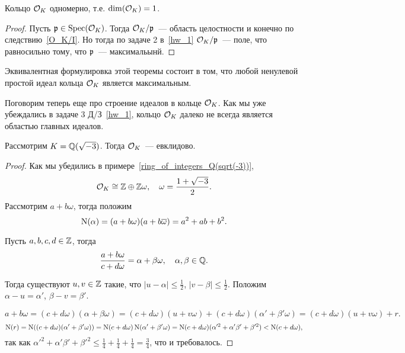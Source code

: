 	\begin{theorem} 
		Кольцо $\mathcal{O}_{K}$ одномерно, т.е. $\dim(\mathcal{O}_{K}) = 1$. 
	\end{theorem}

	\begin{proof}
		Пусть $\mathfrak{p} \in \operatorname{Spec}(\mathcal{O}_{K})$. Тогда $\mathcal{O}_{K}/\mathfrak{p}$~--- область целостности и конечно по  следствию~\ref{O_K/I}. Но тогда по задаче 2 в~\ref{hw_1} $\mathcal{O}_{K}/\mathfrak{p}$~--- поле, что равносильно тому, что $\mathfrak{p}$~--- максимальынй. 
	\end{proof}

	\begin{remark}
		Эквивалентная формулировка этой теоремы состоит в том, что любой ненулевой простой идеал  кольца $\mathcal{O}_{K}$ является максимальным. 
	\end{remark}

	Поговорим теперь еще про строение идеалов в кольце $\mathcal{O}_{K}$. Как мы уже убеждались в задаче 3 Д/З~\ref{hw_1}, кольцо $\mathcal{O}_{K}$ далеко не всегда является областью главных идеалов. 

	\begin{statement} 
		Рассмотрим $K = \mathbb{Q}(\sqrt{-3})$. Тогда $\mathcal{O}_{K}$~--- евклидово. 
	\end{statement}

	\begin{proof}
		Как мы убедились в примере~\ref{ring_of_integers_Q(sqrt(-3))}, 
		\[
			\mathcal{O}_{K} \cong \mathbb{Z} \oplus \mathbb{Z} \omega, \quad \omega = \frac{1 + \sqrt{-3}}{2}. 
		\]
		Рассмотрим $a + b \omega$, тогда  положим
		\[
			\operatorname{\mathrm{N}}(\alpha) = (a + b\omega)(a + b\overline{\omega}) = a^2 + ab + b^2.
		\]

		Пусть $a, b, c, d \in \mathbb{Z}$, тогда
		\[
			\frac{a + b\omega}{c + d\omega} = \alpha + \beta \omega, \quad \alpha, \beta \in \mathbb{Q}.
		\]

		Тогда существуют $u, v \in \mathbb{Z}$ такие, что $|u - \alpha| \le \frac{1}{2}$, $|v - \beta| \le \frac{1}{2}$. Положим $\alpha - u = \alpha'$, $\beta - v = \beta'$.

		\[
			a + b\omega = (c + d\omega)(\alpha + \beta \omega) = (c + d\omega)(u + v\omega) + (c + d\omega)(\alpha' + \beta' \omega) = (c + d \omega)(u + v \omega)  + r.
		\]
		\[
			\operatorname{\mathrm{N}}(r) = \operatorname{\mathrm{N}}((c + d\omega)(\alpha' + \beta' \omega)) = \operatorname{\mathrm{N}}(c + d \omega)\operatorname{\mathrm{N}}(\alpha' + \beta' \omega) = \operatorname{\mathrm{N}}(c + d\omega)(\alpha'^2 + \alpha'\beta' + \beta'^2) < \operatorname{\mathrm{N}}(c + d \omega),
		\]
		так как $\alpha'^2 + \alpha'\beta' + \beta'^2 \le \frac{1}{4} + \frac{1}{4} + \frac{1}{4} = \frac{3}{4}$, что и требовалось. 


			
	\end{proof}






